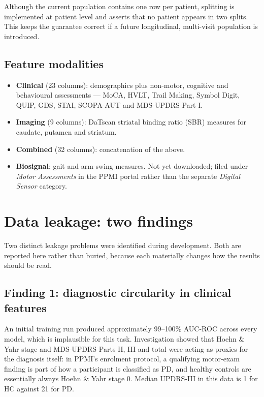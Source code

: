 \documentclass[11pt,a4paper]{article}
\begin{document}
Although the current population contains one row per patient, splitting is
implemented at patient level and asserts that no patient appears in two splits.
This keeps the guarantee correct if a future longitudinal, multi-visit
population is introduced.

\subsection{Feature modalities}

\begin{itemize}
  \item \textbf{Clinical} (23 columns): demographics plus non-motor, cognitive
        and behavioural assessments --- MoCA, HVLT, Trail Making, Symbol Digit,
        QUIP, GDS, STAI, SCOPA-AUT and MDS-UPDRS Part I.
  \item \textbf{Imaging} (9 columns): DaTscan striatal binding ratio (SBR)
        measures for caudate, putamen and striatum.
  \item \textbf{Combined} (32 columns): concatenation of the above.
  \item \textbf{Biosignal}: gait and arm-swing measures. Not yet downloaded;
        filed under \emph{Motor Assessments} in the PPMI portal rather than the
        separate \emph{Digital Sensor} category.
\end{itemize}

\section{Data leakage: two findings}
\label{sec:leakage}

Two distinct leakage problems were identified during development. Both are
reported here rather than buried, because each materially changes how the
results should be read.

\subsection{Finding 1: diagnostic circularity in clinical features}

An initial training run produced approximately 99--100\% AUC-ROC across every
model, which is implausible for this task. Investigation showed that Hoehn \&
Yahr stage and MDS-UPDRS Parts II, III and total were acting as proxies for the
diagnosis itself: in PPMI's enrolment protocol, a qualifying motor-exam finding
is part of how a participant is classified as PD, and healthy controls are
essentially always Hoehn \& Yahr stage 0. Median UPDRS-III in this data is 1 for
HC against 21 for PD.
\end{document}
